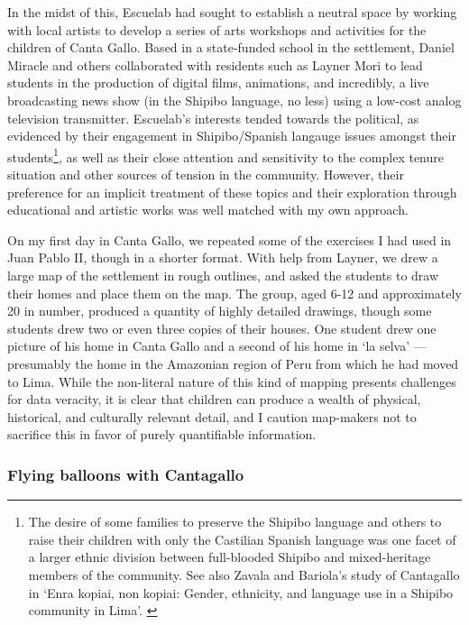 \documentclass[11pt,oneside,notitlepage]{report}
\begin{document}
{{In the midst of this, Escuelab had sought to establish a neutral space by working with local artists to develop a series of arts workshops and activities for the children of Canta Gallo. Based in a state-funded school in the settlement, Daniel Miracle and others collaborated with residents such as Layner Mori to lead students in the production of digital films, animations, and incredibly, a live broadcasting news show (in the Shipibo language, no less) using a low-cost analog television transmitter. Escuelab's interests tended towards the political, as evidenced by their engagement in Shipibo/Spanish langauge issues amongst their students\footnote{The desire of some families to preserve the Shipibo language and others to raise their children with only the Castilian Spanish language was one facet of a larger ethnic division between full-blooded Shipibo and mixed-heritage members of the community. See also Zavala and Bariola's study of Cantagallo in `Enra kopiai, non kopiai: Gender, ethnicity, and language use in a Shipibo community in Lima'. \cite{bariola2008gender}}, as well as their close attention and sensitivity to the complex tenure situation and other sources of tension in the community. However, their preference for an implicit treatment of these topics and their exploration through educational and artistic works was well matched with my own approach.

On my first day in Canta Gallo, we repeated some of the exercises I had used in Juan Pablo II, though in a shorter format. With help from Layner, we drew a large map of the settlement in rough outlines, and asked the students to draw their homes and place them on the map. The group, aged 6-12 and approximately 20 in number, produced a quantity of highly detailed drawings, though some students drew two or even three copies of their houses. One student drew one picture of his home in Canta Gallo and a second of his home in `la selva' --- presumably the home in the Amazonian region of Peru from which he had moved to Lima. While the non-literal nature of this kind of mapping presents challenges for data veracity, it is clear that children can produce a wealth of physical, historical, and culturally relevant detail, and I caution map-makers not to sacrifice this in favor of purely quantifiable information. 

\subsubsection{Flying balloons with Cantagallo}

}}
\end{document}
